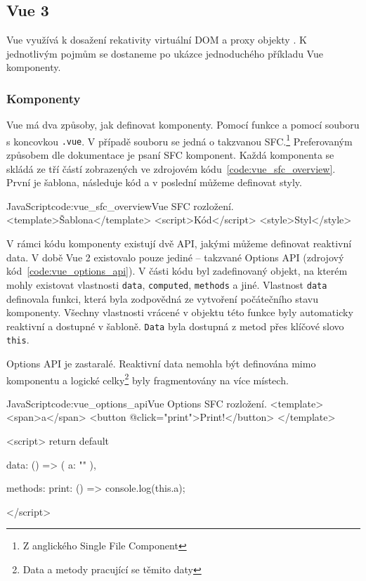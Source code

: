 \documentclass[
  master,
  program=ainf,
  tables=false,
  sourcecodes,
  glossaries,
  index
]{kidiplom}
\begin{document}
\subsection{Vue 3}
Vue \cite{vue} využívá k dosažení rekativity virtuální DOM a proxy objekty \cite{proxy}. K jednotlivým
pojmům se dostaneme po ukázce jednoduchého příkladu Vue komponenty.

\subsubsection{Komponenty}
Vue \cite{vue} má dva způsoby, jak definovat komponenty. Pomocí funkce a pomocí souboru 
s koncovkou {\tt .vue}. V případě souboru se jedná o takzvanou SFC.\footnote{Z anglického Single File Component}
Preferovaným způsobem dle dokumentace je psaní SFC komponent. Každá komponenta se skládá ze tří částí
zobrazených ve zdrojovém kódu~\ref{code:vue_sfc_overview}. První je šablona,
následuje kód a v poslední můžeme definovat styly.

\begin{kicode}{JavaScript}{code:vue_sfc_overview}{Vue SFC rozložení.}
  <template>Šablona</template>
  <script>Kód</script>
  <style>Styl</style>
\end{kicode}

V rámci kódu komponenty existují dvě API, jakými můžeme definovat reaktivní
data. V době Vue 2 \cite{vue2} existovalo pouze jediné -- takzvané Options API (zdrojový kód~\ref{code:vue_options_api}). V části kódu
byl zadefinovaný objekt, na kterém mohly existovat vlastnosti {\tt data}, {\tt computed},
{\tt methods} a jiné. Vlastnost {\tt data} definovala funkci, která byla zodpovědná ze
vytvoření počátečního stavu komponenty. Všechny vlastnosti vrácené v objektu
této funkce byly automaticky reaktivní a dostupné v šabloně. {\tt Data} byla dostupná
z metod přes klíčové slovo {\tt this}.

Options API je zastaralé. Reaktivní data nemohla být definována mimo komponentu
a logické celky\footnote{Data a metody pracující se těmito daty} byly 
fragmentovány na více místech. 

  \begin{kicode}{JavaScript}{code:vue_options_api}{Vue Options SFC rozložení.}
    <template>
      <span>{{a}}</span>
      <button @click="print">Print!</button>
    </template>
  
    <script>
      return default {
        data: () => ({
          a: ""
        }),
  
        methods: {
          print: () => {
            console.log(this.a);
          }
        }
      }
    </script>
  \end{kicode}
\end{document}

